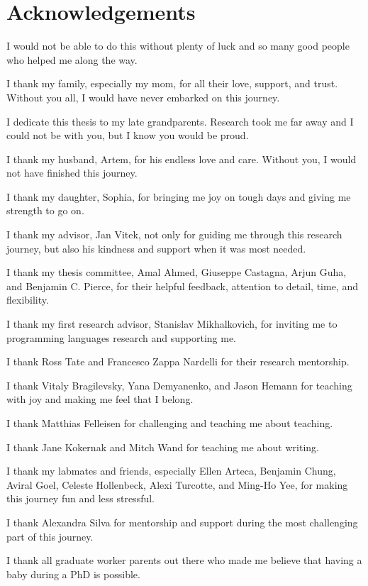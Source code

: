 \documentclass[11pt,
  footinclude,headinclude,
  abstract=on
]{scrreprt}
\begin{document}


\cleardoublepage
\section*{Acknowledgements}

I would not be able to do this without plenty of luck and so many good people who helped me along the way.

I thank my family, especially my mom,
for all their love, support, and trust. Without you all, I would have never
embarked on this journey.

I dedicate this thesis to my late grandparents. Research took me far away
and I could not be with you, but I know you would be proud.

I thank my husband, Artem, for his endless love and care. Without you, I would not have finished this journey.

I thank my daughter, Sophia, for bringing me joy on tough days and giving me strength to go on.

I thank my advisor, Jan Vitek, not only for guiding me through this research journey, but also his kindness and support when it was most needed.

I thank my thesis committee, Amal Ahmed, Giuseppe Castagna, Arjun Guha, and Benjamin C. Pierce, for their helpful feedback, attention to detail, time, and flexibility.

I thank my first research advisor, Stanislav Mikhalkovich, for inviting me to programming languages research and supporting me.

I thank Ross Tate and Francesco Zappa Nardelli for their research mentorship.

I thank Vitaly Bragilevsky, Yana Demyanenko, and Jason Hemann for teaching with joy and making me feel that I belong.

I thank Matthias Felleisen for challenging and teaching me about teaching. 

I thank Jane Kokernak and Mitch Wand for teaching me about writing.

I thank my labmates and friends, especially Ellen Arteca, Benjamin Chung, Aviral Goel, Celeste Hollenbeck, Alexi Turcotte, and Ming-Ho Yee, for making this journey fun and less stressful.

I thank Alexandra Silva for mentorship and support during the most challenging part of this journey.

I thank all graduate worker parents out there who made me believe that having a baby during a PhD is possible.
\end{document}
